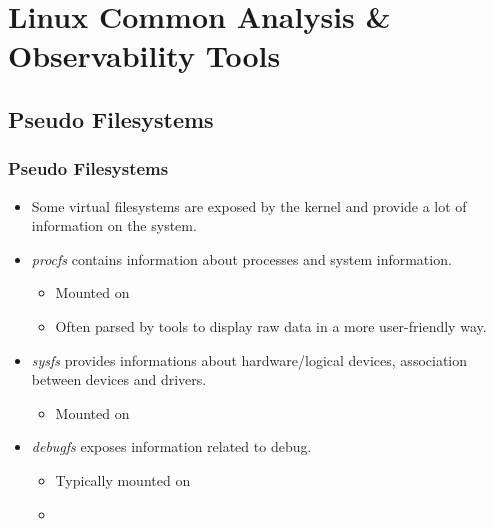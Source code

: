 \section{Linux Common Analysis \& Observability Tools}

\subsection{Pseudo Filesystems}

\begin{frame}
  \frametitle{Pseudo Filesystems}
  \begin{itemize}
    \item Some virtual filesystems are exposed by the kernel and provide a lot
          of information on the system.
    \item {\em procfs} contains information about processes and system
          information.
    \begin{itemize}
      \item Mounted on 
      \item Often parsed by tools to display raw data in a more user-friendly
            way.
    \end{itemize}
    \item {\em sysfs} provides informations about hardware/logical devices,
          association between devices and drivers.
    \begin{itemize}
      \item Mounted on 
    \end{itemize}
    \item {\em debugfs} exposes information related to debug.
    \begin{itemize}
      \item Typically mounted on 
      \item {}
    \end{itemize}
  \end{itemize}
\end{frame}

